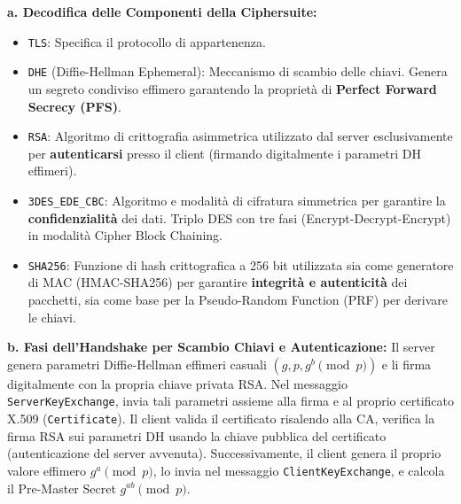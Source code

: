 \documentclass[11pt,a4paper]{article}
\begin{document}
\begin{solutionbox}
\textbf{a. Decodifica delle Componenti della Ciphersuite:}
\begin{itemize}
    \item \texttt{TLS}: Specifica il protocollo di appartenenza.
    \item \texttt{DHE} (Diffie-Hellman Ephemeral): Meccanismo di scambio delle chiavi. Genera un segreto condiviso effimero garantendo la propriet\`a di \textbf{Perfect Forward Secrecy (PFS)}.
    \item \texttt{RSA}: Algoritmo di crittografia asimmetrica utilizzato dal server esclusivamente per \textbf{autenticarsi} presso il client (firmando digitalmente i parametri DH effimeri).
    \item \texttt{3DES\_EDE\_CBC}: Algoritmo e modalit\`a di cifratura simmetrica per garantire la \textbf{confidenzialit\`a} dei dati. Triplo DES con tre fasi (Encrypt-Decrypt-Encrypt) in modalit\`a Cipher Block Chaining.
    \item \texttt{SHA256}: Funzione di hash crittografica a 256 bit utilizzata sia come generatore di MAC (HMAC-SHA256) per garantire \textbf{integrit\`a e autenticit\`a} dei pacchetti, sia come base per la Pseudo-Random Function (PRF) per derivare le chiavi.
\end{itemize}

\textbf{b. Fasi dell'Handshake per Scambio Chiavi e Autenticazione:}
Il server genera parametri Diffie-Hellman effimeri casuali $(g, p, g^b \pmod p)$ e li firma digitalmente con la propria chiave privata RSA. Nel messaggio \texttt{ServerKeyExchange}, invia tali parametri assieme alla firma e al proprio certificato X.509 (\texttt{Certificate}). Il client valida il certificato risalendo alla CA, verifica la firma RSA sui parametri DH usando la chiave pubblica del certificato (autenticazione del server avvenuta). Successivamente, il client genera il proprio valore effimero $g^a \pmod p$, lo invia nel messaggio \texttt{ClientKeyExchange}, e calcola il Pre-Master Secret $g^{ab} \pmod p$.


\end{solutionbox}
\end{document}
